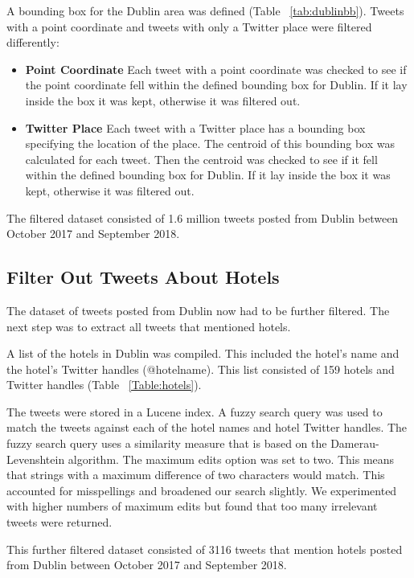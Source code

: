 A bounding box for the Dublin area was defined (Table ~\ref{tab:dublinbb}). Tweets with a point coordinate and tweets with only a Twitter place were filtered differently:
\begin{itemize}
    \item \textbf{Point Coordinate}\newline
    Each tweet with a point coordinate was checked to see if the point coordinate fell within the defined bounding box for Dublin. If it lay inside the box it was kept, otherwise it was filtered out.
    \item \textbf{Twitter Place}\newline
    Each tweet with a Twitter place has a bounding box specifying the location of the place. The centroid of this bounding box was calculated for each tweet. Then the centroid was checked to see if it fell within the defined bounding box for Dublin. If it lay inside the box it was kept, otherwise it was filtered out.
\end{itemize}

The filtered dataset consisted of 1.6 million tweets posted from Dublin between October 2017 and September 2018.

\subsection*{Filter Out Tweets About Hotels}

The dataset of tweets posted from Dublin now had to be further filtered. The next step was to extract all tweets that mentioned hotels.

A list of the hotels in Dublin was compiled. This included the hotel's name and the hotel's Twitter handles (@hotelname). This list consisted of 159 hotels and Twitter handles (Table ~\ref{Table:hotels}).

The tweets were stored in a Lucene index. A fuzzy search query was used to match the tweets against each of the hotel names and hotel Twitter handles. The fuzzy search query uses a similarity measure that is based on the Damerau-Levenshtein algorithm. The maximum edits option was set to two. This means that strings with a maximum difference of two characters would match. This accounted for misspellings and broadened our search slightly. We experimented with higher numbers of maximum edits but found that too many irrelevant tweets were returned.

This further filtered dataset consisted of 3116 tweets that mention hotels posted from Dublin between October 2017 and September 2018.

